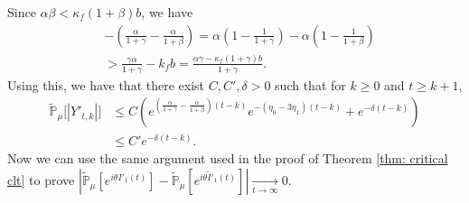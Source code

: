 \documentclass[12pt,a4paper]{amsart}
\theoremstyle{plain}
\theoremstyle{definition}
\numberwithin{equation}{section}
\begin{document}
    Since $\alpha\beta<\kappa_f(1+\beta)b$,  we have
\begin{equation}\begin{split}
\label{eq: condition for supercritical}
	&-(\frac{\alpha}{1+\gamma}-\frac{\alpha}{1+\beta})
    = \alpha(1-\frac{1}{1+\gamma}) - \alpha(1-\frac{1}{1+\beta})
    \\&> \frac{\gamma \alpha}{1+\gamma} - k_f b
    =\frac{\alpha \gamma-\kappa_f(1+\gamma)b}{1+\gamma}.
\end{split}\end{equation}
	Using this, we have that there exist $C,C',
    \delta > 0$ such that for $k\geq 0$ and $t\geq k+1$,
\begin{align*}
    \mathbb{\tilde{P}}_{\mu}\big[|Y'_{t,k}|\big]
    & \leq C( e^{(\frac{\alpha}{1+\gamma} - \frac{\alpha}{1+\beta})(t-k)}e^{-(\eta_0 - 3\eta_1)(t-k)}+ e^{-\delta(t-k)})
    \\& \leq C'e^{-\delta (t-k)}.
\end{align*}
    Now we can  use the  same argument used in the proof of Theorem \ref{thm: critical clt} to prove $|\mathbb{\tilde{P}}_{\mu}[e^{i\theta I'_1(t)}]-\mathbb{\tilde{P}}_{\mu}[e^{i\theta\tilde I'_1(t)}]|\xrightarrow[t\to \infty]{} 0$.
\end{document}
